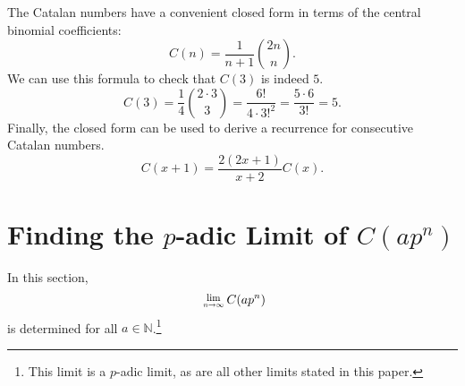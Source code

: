 \documentclass[12pt, letter]{article}    %
\theoremstyle{plain}
\theoremstyle{definition}
\numberwithin{equation}{section}
\newcommand{\Lim}[1]{\raisebox{0.5ex}{\scalebox{0.8}{$\displaystyle \lim_{#1}\;$}}}
\begin{document}
The Catalan numbers have a convenient closed form in terms of the central binomial coefficients:
$$C(n)=\frac{1}{n+1}\binom{2n}{n}.$$
We can use this formula to check that $C(3)$ is indeed $5$.
$$C(3)=\frac{1}{4}\binom{2\cdot3}{3}=\frac{6!}{4\cdot 3!^2}=\frac{5\cdot 6}{3!}=5.$$
Finally, the closed form can be used to derive a recurrence for consecutive Catalan numbers. $$C(x+1)=\frac{2(2x+1)}{x+2}C(x).$$





\section{Finding the $p$-adic Limit of $C(ap^n)$}

In this section, 
\begin{equation}\label{limit eq}\
\Lim{n\rightarrow\infty}C(ap^n)
\end{equation} is determined for all $a\in\mathbb{N}$.\footnote{This limit is a $p$-adic limit, as are all other limits stated in this paper.}
\end{document}
